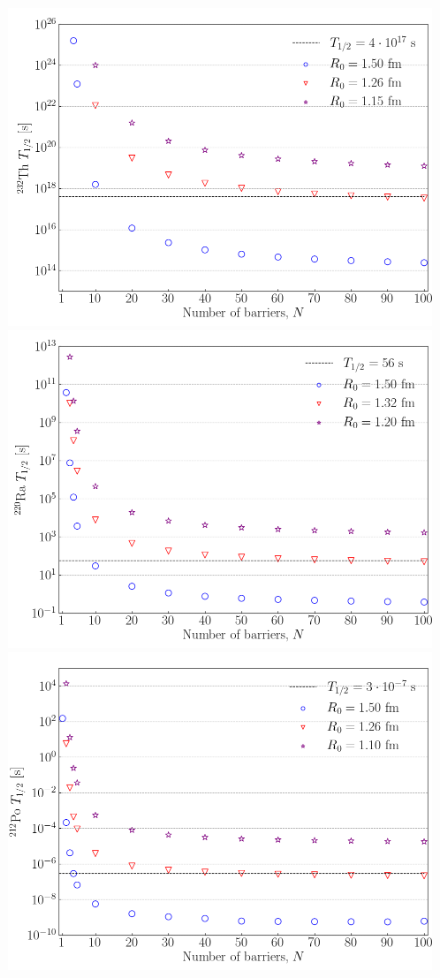 \documentclass[twocolumn]{article}
\begin{document}
\begin{large}
\begin{figure}
    \centering
    \includegraphics[scale=0.4]{232Th_Thalf.png}
    \includegraphics[scale=0.4]{220Ra_Thalf.png}
    \includegraphics[scale=0.4]{212Po_Thalf.png}

\end{figure}
\end{large}
\end{document}
